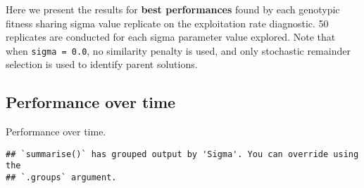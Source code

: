 \documentclass[]{book}
\newenvironment{Shaded}{\begin{snugshade}}{\end{snugshade}}
\newcommand{\DataTypeTok}[1]{\textcolor[rgb]{0.13,0.29,0.53}{#1}}
\newcommand{\KeywordTok}[1]{\textcolor[rgb]{0.13,0.29,0.53}{\textbf{#1}}}
\newcommand{\NormalTok}[1]{#1}
\newcommand{\OperatorTok}[1]{\textcolor[rgb]{0.81,0.36,0.00}{\textbf{#1}}}
\newcommand{\StringTok}[1]{\textcolor[rgb]{0.31,0.60,0.02}{#1}}
\begin{document}
Here we present the results for \textbf{best performances} found by each genotypic fitness sharing sigma value replicate on the exploitation rate diagnostic.
50 replicates are conducted for each sigma parameter value explored.
Note that when \texttt{sigma\ =\ 0.0}, no similarity penalty is used, and only stochastic remainder selection is used to identify parent solutions.

\hypertarget{performance-over-time-10}{%
\subsection{Performance over time}\label{performance-over-time-10}}

Performance over time.

\begin{Shaded}
\end{Shaded}

\begin{verbatim}
## `summarise()` has grouped output by 'Sigma'. You can override using the
## `.groups` argument.
\end{verbatim}
\end{document}
